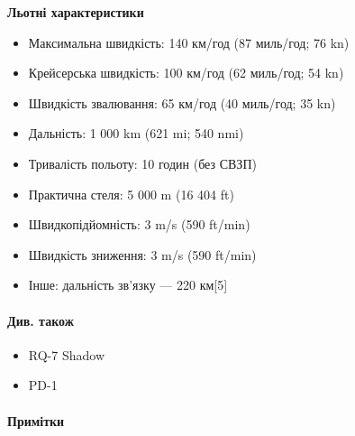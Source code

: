 \textbf{Льотні характеристики}

\begin{itemize}
  \item Максимальна швидкість: 140 км/год (87 миль/год; 76 kn)
  \item Крейсерська швидкість: 100 км/год (62 миль/год; 54 kn)
  \item Швидкість звалювання: 65 км/год (40 миль/год; 35 kn)
  \item Дальність: 1 000 km (621 mi; 540 nmi)
  \item Тривалість польоту: 10 годин (без СВЗП)
  \item Практична стеля: 5 000 m (16 404 ft)
  \item Швидкопідйомність: 3 m/s (590 ft/min)
  \item Швидкість зниження: 3 m/s (590 ft/min)
  \item Інше: дальність зв'язку — 220 км[5]
\end{itemize}

\paragraph{Див. також}

\begin{itemize}
  \item RQ-7 Shadow
  \item PD-1
\end{itemize}

\paragraph{Примітки}

